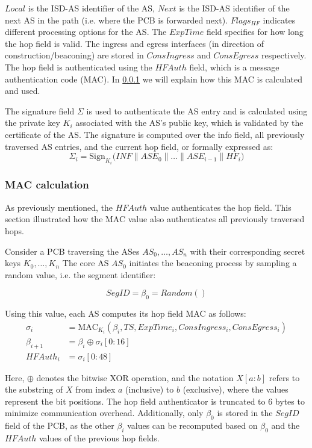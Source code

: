 $Local$ is the ISD-AS identifier of the AS, $Next$ is the ISD-AS identifier of the next AS in the path (i.e. where the PCB is forwarded next).
$Flags_{HF}$ indicates different processing options for the AS.
The $ExpTime$ field specifies for how long the hop field is valid.
The ingress and egress interfaces (in direction of construction/beaconing) are stored in $ConsIngress$ and $ConsEgress$ respectively.
The hop field is authenticated using the $HFAuth$ field, which is a message authentication code (MAC).
In \cref{sec:mac_calc} we will explain how this MAC is calculated and used.

The signature field $\Sigma$ is used to authenticate the AS entry and is calculated using the private key $K_i$ associated with the AS's public key, which is validated by the certificate of the AS.
The signature is computed over the info field, all previously traversed AS entries, and the current hop field, or formally expressed as:
$$\Sigma_i = \text{Sign}_{K_i} \bigl( INF \parallel ASE_0 \parallel \dots \parallel ASE_{i-1} \parallel HF_i \bigr)$$

\subsubsection{MAC calculation}
\label{sec:mac_calc}
As previously mentioned, the $HFAuth$ value authenticates the hop field.
This section illustrated how the MAC value also authenticates all previously traversed hops.

Consider a PCB traversing the ASes $AS_0, \dots, AS_n$ with their corresponding secret keys $K_0, \dots, K_n$
The core AS $AS_0$ initiates the beaconing process by sampling a random value, i.e. the segment identifier:

$$ SegID = \beta_0 = Random() $$

Using this value, each AS computes its hop field MAC as follows:
\begin{align*}
    \sigma_i    &= \text{MAC}_{K_i}(\beta_i, TS, ExpTime_i, ConsIngress_i, ConsEgress_i) \\
    \beta_{i+1} &= \beta_i \oplus \sigma_i[0:16] \\
    HFAuth_i &= \sigma_i[0:48]
\end{align*}

Here, $\oplus$ denotes the bitwise XOR operation, and the notation $X[a:b]$ refers to the substring of $X$ from index $a$ (inclusive) to $b$ (exclusive), where the values represent the bit positions.
The hop field authenticator is truncated to 6 bytes to minimize communication overhead.
Additionally, only $\beta_0$ is stored in the $SegID$ field of the PCB, as the other $\beta_i$ values can be recomputed based on $\beta_0$ and the $HFAuth$ values of the previous hop fields.


